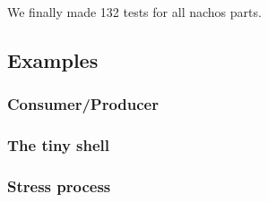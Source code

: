 We finally made 132 tests for all nachos parts. 

\subsection{Examples}
\subsubsection{Consumer/Producer}
\subsubsection{The tiny shell}
\subsubsection{Stress process}

%

